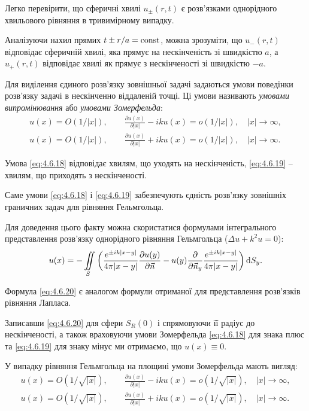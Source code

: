 Легко перевірити, що сферичні хвилі $u_\pm(r, t)$ є розв'язками однорідного хвильового рівняння в тривимірному випадку. \medskip

Аналізуючи нахил прямих $t \pm r / a = \operatorname{const}$, можна зрозуміти, що $u_-(r, t)$ відповідає сферичній хвилі, яка прямує на нескінченість зі швидкістю $a$, а $u_+(r, t)$ відповідає хвилі як прямує з нескінченості зі швидкістю $-a$. \medskip

\begin{definition}
	Для виділення єдиного розв'язку зовнішньої задачі задаються умови поведінки розв'язку задачі в нескінченно віддаленій точці. Ці умови називають \textit{умовами випромінювання} або \textit{умовами Зомерфельда}:
	\begin{gather}
		\label{eq:4.6.18}
		u(x) = O(1/|x|), \qquad \frac{\partial u(x)}{\partial |x|} - i k u(x) = o(1/|x|), \quad |x| \to \infty, \\
		\label{eq:4.6.19}
		u(x) = O(1/|x|), \qquad \frac{\partial u(x)}{\partial |x|} + i k u(x) = o(1/|x|), \quad |x| \to \infty.
	\end{gather}
\end{definition}

Умова \eqref{eq:4.6.18} відповідає хвилям, що уходять на нескінченість, \eqref{eq:4.6.19} – хвилям, що приходять з нескінченості. \medskip

Саме умови \eqref{eq:4.6.18} і \eqref{eq:4.6.19} забезпечують єдність розв'язку зовнішніх граничних задач для рівняння Гельмгольца. \medskip

Для доведення цього факту можна скористатися формулами інтегрального представлення розв'язку однорідного рівняння Гельмгольца ($\Delta u + k^2 u = 0$):
\begin{equation}
	\label{eq:4.6.20}
	u(x) = -\displaystyle\iint\limits_S \left( \frac{e^{\pm i k |x - y|}}{4 \pi |x - y|} \frac{\partial u(y)}{\partial \vec n} - u(y) \frac{\partial}{\partial \vec n_y} \frac{e^{\pm i k |x - y|}}{4 \pi |x - y|} \right) \mathop{}\!\mathrm{d} S_y.
\end{equation}

Формула \eqref{eq:4.6.20} є аналогом формули  отриманої для представлення розв'язків рівняння Лапласа. \medskip

Записавши \eqref{eq:4.6.20} для сфери $S_R(0)$ і спрямовуючи її радіус до нескінченості, а також враховуючи умови Зомерфельда \eqref{eq:4.6.18} для знака плюс та \eqref{eq:4.6.19} для знаку мінус ми отримаємо, що $u(x) \equiv 0$. \medskip

У випадку рівняння Гельмгольца на площині умови Зомерфельда мають вигляд:
\begin{gather}
	\label{eq:4.6.21}
	u(x) = O\left(1/\sqrt{|x|}\right), \qquad \frac{\partial u(x)}{\partial |x|} - i k u(x) = o\left(1/\sqrt{|x|}\right), \quad |x| \to \infty, \\
	\label{eq:4.6.22}
	u(x) = O\left(1/\sqrt{|x|}\right), \qquad \frac{\partial u(x)}{\partial |x|} + i k u(x) = o\left(1/\sqrt{|x|}\right), \quad |x| \to \infty.
\end{gather}


